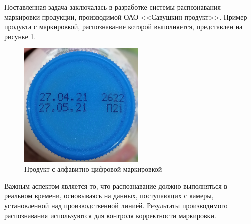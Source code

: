 Поставленная задача заключалась в разработке системы распознавания маркировки продукции, производимой ОАО <<Савушкин продукт>>. Пример продукта с маркировкой, распознавание которой выполняется, представлен на рисунке \ref{fig:digital_code}.

\begin{figure}[ht]
	\centering
	\includegraphics[width=6cm]{man-source/images/ch4/pic4-1.jpg}
	\caption{Продукт с алфавитно-цифровой маркировкой}
	\label{fig:digital_code}
\end{figure}

Важным аспектом является то, что распознавание должно выполняться в реальном времени, основываясь на данных, поступающих с камеры, установленной над производственной линией. Результаты производимого распознавания используются для контроля корректности маркировки.





